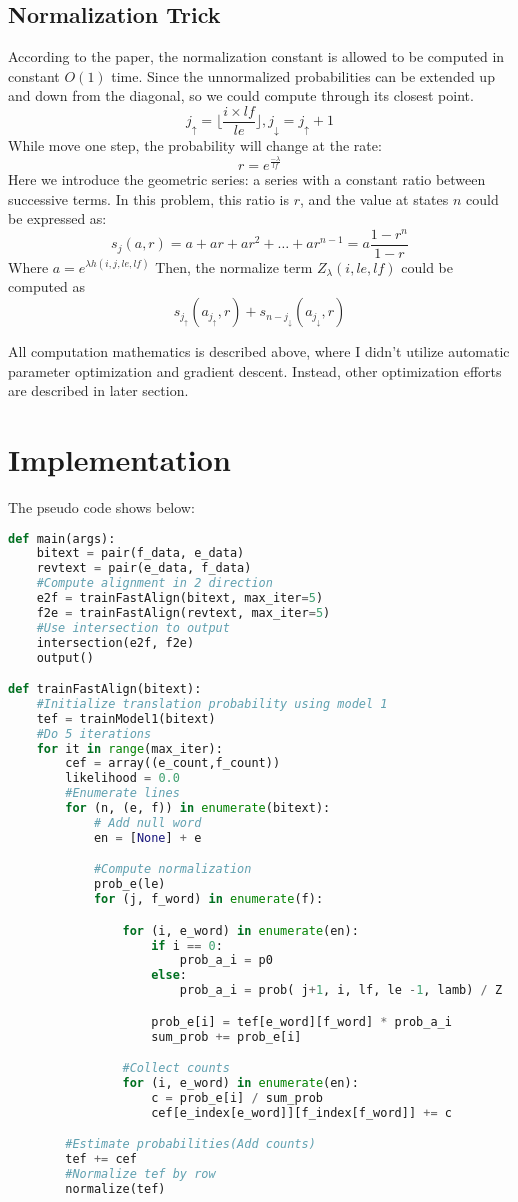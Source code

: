\documentclass[11pt]{article}
\begin{document}
\subsection{Normalization Trick} %
\label{sub:normalization_trick}
According to the paper, the normalization constant is allowed to be computed in constant $O(1)$ time. Since the unnormalized probabilities can be extended up and down from the diagonal, so we could compute through its closest point.
$$ j_{\uparrow} = \lfloor \frac{i \times lf }{le}\rfloor, j_{\downarrow} = j_{\uparrow} + 1 $$
While move one step, the probability will change at the rate:
$$ r = e^{\frac{-\lambda}{lf}}$$
Here we introduce the geometric series: a series with a constant ratio between successive terms. In this problem, this ratio is $r$, and the value at states $n$ could be expressed as:
$$ s_j(a,r) = a + ar + ar^2 + \dots + ar^{n-1} = a\frac{1-r^n}{1-r}$$
Where $ a = e^{\lambda h(i,j,le,lf)}$
Then, the normalize term $Z_{\lambda}(i, le, lf)$ could be computed as
$$ s_{j_{\uparrow}}(a_{j_{\uparrow}}, r) + s_{n-j_{\downarrow}}(a_{j_{\downarrow}}, r)$$

All computation mathematics is described above, where I didn't utilize automatic parameter optimization and gradient descent. Instead, other optimization efforts are described in later section.

\section{Implementation} %
\label{sec:implementation}
The pseudo code shows below:
\begin{lstlisting}[language=Python, caption={fast\_align.py}]
def main(args):
	bitext = pair(f_data, e_data)
	revtext = pair(e_data, f_data)
	#Compute alignment in 2 direction
	e2f = trainFastAlign(bitext, max_iter=5)
	f2e = trainFastAlign(revtext, max_iter=5)
	#Use intersection to output
	intersection(e2f, f2e)
	output()

def trainFastAlign(bitext):
	#Initialize translation probability using model 1
	tef = trainModel1(bitext)
	#Do 5 iterations
	for it in range(max_iter):
		cef = array((e_count,f_count))
		likelihood = 0.0
		#Enumerate lines
		for (n, (e, f)) in enumerate(bitext):
			# Add null word
			en = [None] + e

			#Compute normalization
			prob_e(le)
			for (j, f_word) in enumerate(f):

				for (i, e_word) in enumerate(en):
					if i == 0:
						prob_a_i = p0
					else:
						prob_a_i = prob( j+1, i, lf, le -1, lamb) / Z

					prob_e[i] = tef[e_word][f_word] * prob_a_i
					sum_prob += prob_e[i]

				#Collect counts
				for (i, e_word) in enumerate(en):
					c = prob_e[i] / sum_prob
					cef[e_index[e_word]][f_index[f_word]] += c

		#Estimate probabilities(Add counts)
		tef += cef
		#Normalize tef by row
		normalize(tef)

\end{lstlisting}
\end{document}
